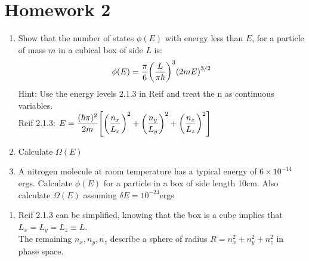 \documentclass{article}
\begin{document}
\section{Homework 2}
    \begin{problem}
        \begin{enumerate}[label=(\alph*)]
            \item Show that the number of states $\phi(E)$ with energy less than $E$, for a particle of mass $m$ in a cubical box of side $L$ is:
            $$\phi(E)=\frac{\pi}{6}\qty(\frac{L}{\pi\hbar})^3\qty(2mE)^{3/2}$$
            Hint: Use the energy levels 2.1.3 in Reif and treat the n as continuous variables.
            \\[0.5 cm]
            Reif 2.1.3: $\displaystyle E=\frac{(\hbar \pi)^2}{2m}\qty[\qty(\frac{n_x}{L_x})^2+ \qty(\frac{n_y}{L_y})^2+ \qty(\frac{n_z}{L_z})^2]$
            \item Calculate $\Omega(E)$
            \item A nitrogen molecule at room temperature has a typical energy of $6\times10^{-14}$ergs. Calculate $\phi(E)$ for a particle in a box of side length 10cm. Also calculate $\Omega(E)$ assuming $\delta E=10^{-24}$ergs
        \end{enumerate}
        \answerline
        \begin{enumerate}[label=\alph*)]
            \item Reif 2.1.3 can be simplified, knowing that the box is a cube implies that $L_x=L_y=L_z\equiv L$. 
            \\
            The remaining $n_x,n_y,n_z$ describe a sphere of radius $R=n_x^2+n_y^2+n_z^2$ in phase space. 
            \begin{figure}[H]
                \centering
\end{figure}
\end{enumerate}
\end{problem}
\end{document}
